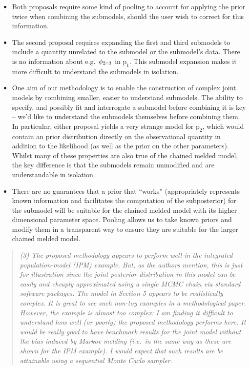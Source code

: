 \documentclass[
  10pt,
  a4paper,
]{article}
\providecommand{\tightlist}{%
  \setlength{\itemsep}{0pt}\setlength{\parskip}{0pt}}
\let\Oldcap\cap
\renewcommand{\cap}{\mathrel{\mathsmaller{\Oldcap}}}
\newcommand{\pd}{\text{p}}
\begin{document}
\begin{itemize}
  \begin{itemize}
  \tightlist
  \item
    Both proposals require some kind of pooling to account for applying
    the prior twice when combining the submodels, should the user wish
    to correct for this information.
  \item
    The second proposal requires expanding the first and third submodels
    to include a quantity unrelated to the submodel or the submodel's
    data. There is no information about e.g.~\(\phi_{2 \cap 3}\) in
    \(\pd_{1}\). This submodel expansion makes it more difficult to
    understand the submodels in isolation.
  \item
    One aim of our methodology is to enable the construction of complex
    joint models by combining smaller, easier to understand submodels.
    The ability to specify, and possibly fit and interrogate a submodel
    before combining it is key -- we'd like to understand the submodels
    themselves before combining them. In particular, either proposal
    yields a very strange model for \(\pd_{2}\), which would contain an
    prior distribution directly on the observational quantity in
    addition to the likelihood (as well as the prior on the other
    parameters). Whilst many of these properties are also true of the
    chained melded model, the key difference is that the submodels
    remain unmodified and are understandable in isolation.
  \item
    There are no guarantees that a prior that ``works'' (appropriately
    represents known information and facilitates the computation of the
    subposterior) for the submodel will be suitable for the chained
    melded model with its higher dimensional parameter space. Pooling
    allows us to take known priors and modify them in a transparent way
    to ensure they are suitable for the larger chained melded model.
  \end{itemize}
\end{itemize}

\begin{quote}
\emph{(3) The proposed methodology appears to perform well in the
integrated-population-model (IPM) example. But, as the authors mention,
this is just for illustration since the joint posterior distribution in
this model can be easily and cheaply approximated using a single MCMC
chain via standard software packages.} \emph{The model in Section 5
appears to be realistically complex. It is great to see such non-toy
examples in a methodological paper. However, the example is almost too
complex: I am finding it difficult to understand how well (or poorly)
the proposed methodology performs here. It would be really good to have
benchmark results for the joint model without the bias induced by Markov
melding (i.e.~in the same way as these are shown for the IPM example). I
would expect that such results are be attainable using a sequential
Monte Carlo sampler.}
\end{quote}
\end{document}
